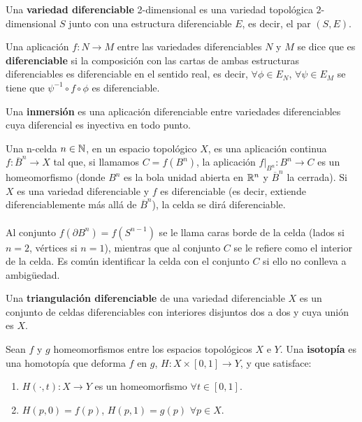 \begin{definicion} Una \textbf{variedad diferenciable} 2-dimensional es una variedad topológica $2$-dimensional $S$ junto con una estructura diferenciable $E$, es decir, el par $(S, E)$.
\end{definicion}

\begin{definicion} Una aplicación $f: N \rightarrow M$ entre las variedades diferenciables $N$ y $M$ se dice que es \textbf{diferenciable} si la composición con las cartas de ambas estructuras diferenciables es diferenciable en el sentido real, es decir, $\forall \phi \in E_N$, $\forall \psi \in E_M$ se tiene que $\psi^{-1} \circ f \circ \phi$ es diferenciable.
\end{definicion}

\begin{definicion} Una \textbf{inmersión} es una aplicación diferenciable entre variedades diferenciables cuya diferencial es inyectiva en todo punto.
\end{definicion}

\begin{definicion} Una n-celda $n \in \mathbb{N}$, en un espacio topológico $X$, es una aplicación continua $f: \overline{B}^n \rightarrow X$ tal que, si llamamos $C=f(B^n)$, la aplicación $f|_{B^n}:B^n \rightarrow C$ es un homeomorfismo (donde $B^n$ es la bola unidad abierta en $\mathbb{R}^n$ y $\overline{B}^n$ la cerrada). Si $X$ es una variedad diferenciable y $f$ es diferenciable (es decir, extiende diferenciablemente más allá de $\overline{B}^n$), la celda se dirá diferenciable.\\
\\Al conjunto $f(\partial B^n)=f(S^{n-1})$ se le llama caras borde de la celda (lados si $n=2$, vértices si $n=1$), mientras que al conjunto $C$ se le refiere como el interior de la celda. Es común identificar la celda con el conjunto $C$ si ello no conlleva a ambigüedad.
\end{definicion}

\begin{definicion} Una \textbf{triangulación diferenciable} de una variedad diferenciable $X$ es un conjunto de celdas diferenciables con interiores disjuntos dos a dos y cuya unión es $X$.
\end{definicion}
\newpage
\begin{definicion} Sean $f$ y $g$ homeomorfismos entre los espacios topológicos $X$ e $Y$. Una \textbf{isotopía} es una homotopía que deforma $f$ en $g$, $H: X \times [0,1] \rightarrow Y$, y que satisface:
	\begin{enumerate}
		\item $H(\cdot, t) : X \rightarrow Y$ es un homeomorfismo $\forall t \in [0,1]$.
		\item $H(p, 0) = f(p)$, $H(p, 1) = g(p)$ $\forall p \in X$.
	\end{enumerate}
\end{definicion}

